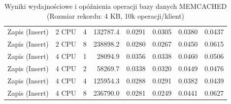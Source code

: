 \begin{table}[ht]
{\begin{tabular}{llcrrrrr}
Zapis (Insert) & 2 CPU & 4 & 132787.4 & 0.0291 & 0.0305 & 0.0380 & 0.0437 \\
Zapis (Insert) & 2 CPU & 8 & 238898.2 & 0.0280 & 0.0267 & 0.0450 & 0.0615 \\
Zapis (Insert) & 4 CPU & 1 & 28094.9 & 0.0356 & 0.0338 & 0.0460 & 0.0506 \\
Zapis (Insert) & 4 CPU & 2 & 58269.7 & 0.0338 & 0.0320 & 0.0449 & 0.0476 \\
Zapis (Insert) & 4 CPU & 4 & 125954.3 & 0.0288 & 0.0291 & 0.0382 & 0.0439 \\
Zapis (Insert) & 4 CPU & 8 & 236790.0 & 0.0281 & 0.0249 & 0.0441 & 0.0627 \\
\bottomrule
\end{tabular}%
}
\caption{Wyniki wydajnościowe i opóźnienia operacji bazy danych MEMCACHED (Rozmiar rekordu: 4 KB, 10k operacji/klient)}
\label{tab:latency_memcached_medium_10000}
\end{table}
